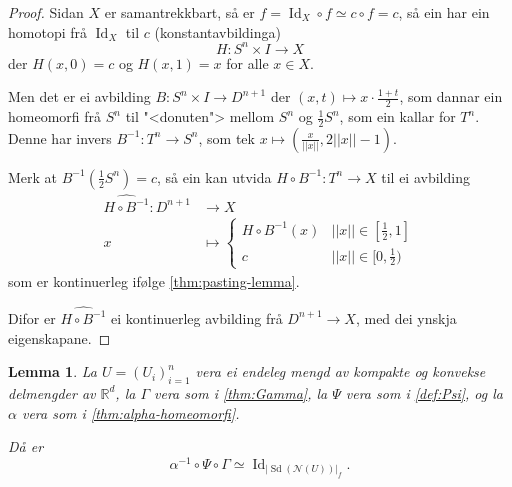 \documentclass[a4paper, 12pt, norsk]{article}
\theoremstyle{plain}
\newtheorem{lemma}[theorem]{Lemma}
\theoremstyle{definition}
\newcommand{\Rb}{\mathbb{R}}
\newcommand{\Nc}{\mathcal{N}}
\newcommand{\gr}[1]{ \lvert #1 \rvert } %
\newcommand{\tuple}[1]{ \left( #1 \right) } %
\DeclareMathOperator{\Sd}{Sd} %
\DeclareMathOperator{\Id}{Id} %
\begin{document}
\begin{proof}
	Sidan \( X \) er samantrekkbart, så er \( f = \Id_X \circ f \simeq c \circ f = c \), så ein har ein homotopi frå \( \Id_X \) til \( c \) (konstantavbildinga)
	\[
		H: S^n \times I \to X
	\]
	der \( H(x, 0) = c \) og \( H(x, 1) = x \) for alle \( x \in X \).

	Men det er ei avbilding \( B: S^n \times I \to D^{n+1} \) der \( (x,t) \mapsto x\cdot\frac{1+t}{2} \), som dannar ein homeomorfi frå \( S^n \) til "<donuten"> mellom \( S^n \) og \( \frac{1}{2}S^n \), som ein kallar for \( T^n \). Denne har invers \( B^{-1}: T^n \to S^n \), som tek \( x \mapsto \tuple{\frac{x}{||x||}, 2||x||-1} \).
	
	Merk at \( B^{-1}\tuple{\frac{1}{2}S^n}= c \), så ein kan utvida \( H \circ B^{-1}: T^n \to X \) til ei avbilding
	\begin{align*}
		\widehat{H \circ B^{-1}} : D^{n+1} &\to X \\
		x &\mapsto
		\begin{cases}
			H \circ B^{-1}(x) & ||x|| \in [\frac{1}{2}, 1] \\
			c & ||x|| \in [0, \frac{1}{2})
		\end{cases}
	\end{align*}
	som er kontinuerleg ifølge \autoref{thm:pasting-lemma}.

	Difor er \( \widehat{H \circ B^{-1}} \) ei kontinuerleg avbilding frå \( D^{n+1} \to X \), med dei ynskja eigenskapane.
\end{proof}

\begin{lemma} \label{thm:homeq-sd}
	La \( U = \tuple{U_i}_{i=1}^n \) vera ei endeleg mengd av kompakte og konvekse delmengder av \( \Rb^d \), la \( \Gamma \) vera som i \autoref{thm:Gamma}, la \( \Psi \) vera som i \autoref{def:Psi}, og la \( \alpha \) vera som i \autoref{thm:alpha-homeomorfi}. 
	
	Då er
	\[
		\alpha^{-1} \circ \Psi \circ \Gamma \simeq \Id_{\gr{\Sd(\Nc(U))}_f}.
	\]
\end{lemma}
\end{document}
